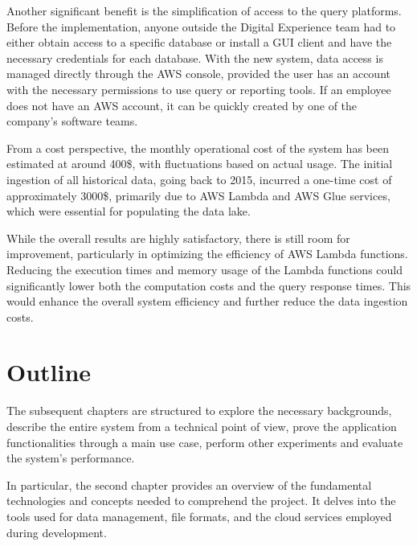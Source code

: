 Another significant benefit is the simplification of access to the query platforms. Before the implementation, anyone outside the Digital Experience team had to either obtain access to a specific database or install a GUI client and have the necessary credentials for each database. With the new system, data access is managed directly through the \ac{AWS} console, provided the user has an account with the necessary permissions to use query or reporting tools. If an employee does not have an \ac{AWS} account, it can be quickly created by one of the company's software teams.

From a cost perspective, the monthly operational cost of the system has been estimated at around 400\$, with fluctuations based on actual usage. The initial ingestion of all historical data, going back to 2015, incurred a one-time cost of approximately 3000\$, primarily due to \ac{AWS} Lambda and \ac{AWS} Glue services, which were essential for populating the data lake.

While the overall results are highly satisfactory, there is still room for improvement, particularly in optimizing the efficiency of \ac{AWS} Lambda functions. Reducing the execution times and memory usage of the Lambda functions could significantly lower both the computation costs and the query response times. This would enhance the overall system efficiency and further reduce the data ingestion costs.
\section{Outline}
The subsequent chapters are structured to explore the necessary backgrounds, describe the entire system from a technical point of view, prove the application functionalities through a main use case, perform other experiments and evaluate the system's performance.


In particular, the second chapter provides an overview of the fundamental technologies and concepts needed to comprehend the project. It delves into the tools used for data management, file formats, and the cloud services employed during development. %

